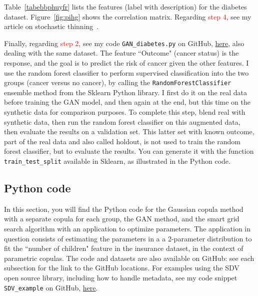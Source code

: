 \documentclass[oneside,10pt]{book}
\begin{document}
Table~\ref{tabebbphuyfr} lists the features (label with description) for the diabetes dataset. Figure~\ref{fig:pihg} shows the correlation matrix.
Regarding \textcolor{red}{step 4}, see my article on stochastic thinning~\cite{vgthin}. 

Finally, 
regarding \textcolor{red}{step 2}, see my code \texttt{GAN\_diabetes.py} on GitHub, 
 \href{https://github.com/VincentGranville/Main/blob/main/GAN_diabetes.py}{here}, also dealing with the same dataset. The feature ``Outcome"  (cancer status) is the response, and the goal is to predict the risk of cancer given the other features. I use the 
\textcolor{index}{random forest classifier} to perform supervised classification into the two groups (cancer versus no cancer), by calling the \texttt{RandomForestClassifier} \textcolor{index}{ensemble method} from the \textcolor{index}{Sklearn} 
Python library. I first do it on the real data before training the GAN model, and then again at the end, but this time on the synthetic data for comparison purposes. To complete this step, blend real with synthetic data, then run the random forest classifier on this 
\textcolor{index}{augmented data}, then evaluate the results on a \textcolor{index}{validation set}. This latter set with known outcome, part of the real data and also called holdout, is not used to train the random forest classifier, but to evaluate the results. You can generate it with the function  \texttt{train\_test\_split}
 available in Sklearn, as illustrated in the Python code. 











\subsection{Python code}

In this section, you will find the Python code for the Gaussian copula method with a separate copula for each group, the GAN method, and 
 the smart grid search algorithm with an application to optimize parameters. The application in question consists of estimating the parameters in a 
 a 2-parameter distribution to fit the ``number of children" feature in the insurance dataset, in the context of parametric copulas. The code and datasets are also available on GitHub: see each subsection for the link to the GitHub locations. For examples using the 
\textcolor{index}{SDV} open source library, including how to
 handle \textcolor{index}{metadata}, 
 see my code snippet \texttt{SDV\_example} on GitHub, \href{https://github.com/VincentGranville/Main/blob/main/SDV_example.py}{here}.
\end{document}
